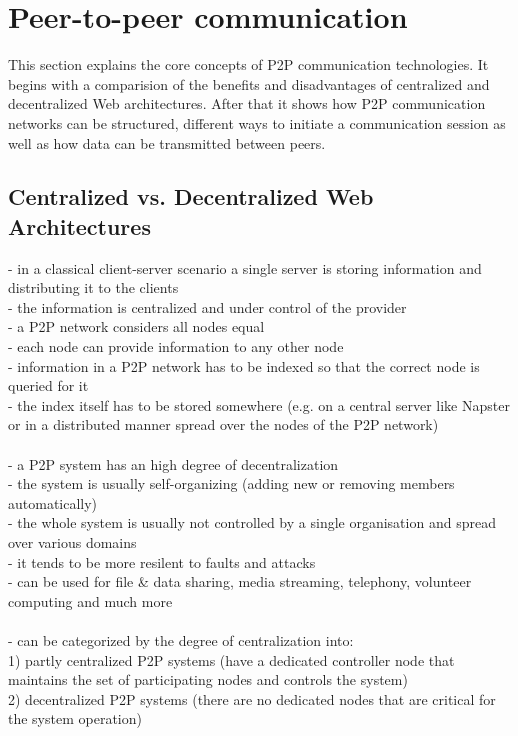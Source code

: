 
\section{Peer-to-peer communication}
\label{sec:p2p_communication}

This section explains the core concepts of \gls{P2P} communication technologies. It begins with a comparision of the benefits and disadvantages of centralized and decentralized Web architectures. After that it shows how \gls{P2P} communication networks can be structured, different ways to initiate a communication session as well as how data can be transmitted between peers. 

\subsection{Centralized vs. Decentralized Web Architectures}

- in a classical client-server scenario a single server is storing information and distributing it to the clients \\
- the information is centralized and under control of the provider \\

- a P2P network considers all nodes equal \\
- each node can provide information to any other node \\
- information in a P2P network has to be indexed so that the correct node is queried for it \\
- the index itself has to be stored somewhere (e.g. on a central server like Napster or in a distributed manner spread over the nodes of the P2P network) \\
\\
- a P2P system has an high degree of decentralization \\
- the system is usually self-organizing (adding new or removing members automatically) \\
- the whole system is usually not controlled by a single organisation and spread over various domains \\
- it tends to be more resilent to faults and attacks \\
- can be used for file \& data sharing, media streaming, telephony, volunteer computing and much more \\
\\
- can be categorized by the degree of centralization into: \\
  1) partly centralized P2P systems (have a dedicated controller node that maintains the set of participating nodes and controls the system) \\
  2) decentralized P2P systems (there are no dedicated nodes that are critical for the system operation) \\
\\
\label{sec:central_decentral_arch}

